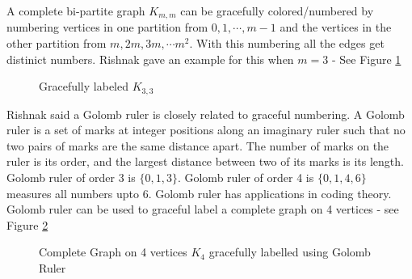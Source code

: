 A complete bi-partite graph $K_{m,m}$ can be gracefully colored/numbered by numbering vertices in one partition from $0,1,\cdots,m-1$ and the vertices
in the other partition from $m,2m,3m,\cdots m^2$. With this numbering all the edges get distinict numbers. Rishnak gave an example for this when $m=3$ - See Figure \ref{18g45}

\begin{figure}
\begin{center}

\caption{Gracefully labeled $K_{3,3}$}\label{18g45}
\end{center}
\end{figure}
Rishnak said a Golomb ruler is closely related to graceful numbering.  A Golomb ruler is a set of marks at integer positions along an imaginary ruler such that no two pairs of marks are the same distance apart. The number of marks on the ruler is its order, and the largest distance between two of its marks is its length.
Golomb ruler of order 3 is $\{0,1,3\}$. Golomb ruler of order 4 is $\{0,1,4,6\}$ measures all numbers upto 6. Golomb ruler has applications in coding theory. Golomb ruler can be used to graceful label a complete graph on 4 vertices - see Figure \ref{19g5}
\begin{figure}
\begin{center}


\caption{Complete Graph on 4 vertices $K_4$ gracefully labelled using Golomb Ruler}\label{19g5}
\end{center}
\end{figure}

